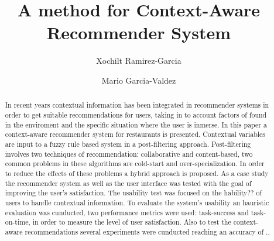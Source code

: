 \title{A method for Context-Aware Recommender System}

\subtitle{}


\author{Xochilt Ramirez-Garcia \and Mario Garcia-Valdez }



\maketitle

\begin{abstract} 

In recent years contextual information has been integrated in 
recommender systems in order to get suitable recommendations 
for users, taking in to account factors of found in the enviroment 
and the specific situation where the user is inmerse.
In this paper a context-aware recommender system for restaurants is presented. 
Contextual variables are input to a fuzzy rule based system in a post-filtering
approach. Post-filtering involves two techniques of
recommendation: collaborative and content-based, two common
problems in these algorithms are cold-start and over-specialization.
In order to reduce the effects of these problems 
a hybrid approach is proposed. As a case study the recommender system as well
as the user interface was tested with the goal of improving the user's
satisfaction. The usability test was focused on the hability?? of users to 
handle contextual information.
To evaluate the system's usability an hauristic evaluation
was cunducted, two performance metrics were used: task-success and task-on-time, in order
to measure the level of user satisfaction.  
Also to test the context-aware recommendations
several experiments were cunducted reaching an accuracy of ..

\end{abstract}

